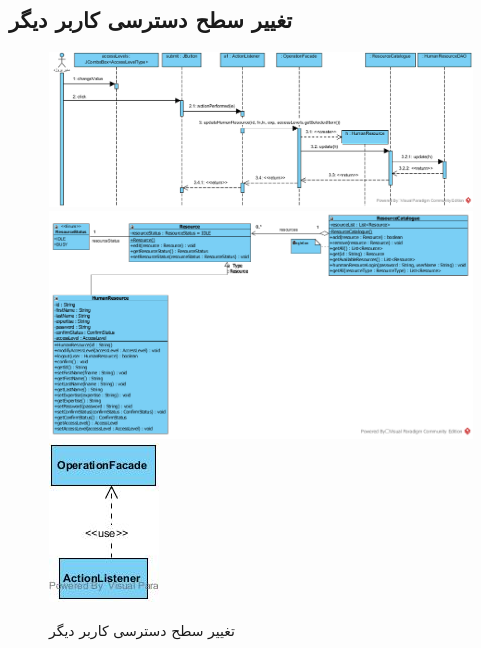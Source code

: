 \begin{landscape}
\section{تغییر سطح دسترسی کاربر دیگر}
\begin{figure}[H]
	\centering
	\includegraphics[scale=0.6]{img/sequence-design/ChangeAccessLevel}
	\includegraphics[scale=0.6]{img/sequence-design/ChangeAccessLevelC}
	\includegraphics[scale=0.6]{img/sequence-design/ChangeAccessLevelUI}
	\caption{تغییر سطح دسترسی کاربر دیگر}
\end{figure}

\newpage

\end{landscape}
